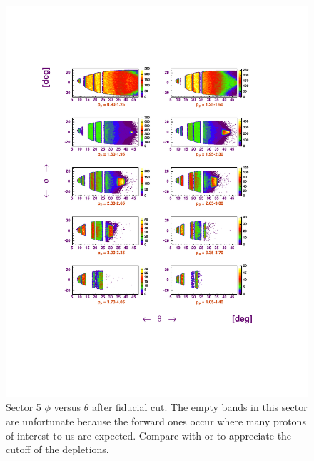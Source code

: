 \cia
\begin{figure}[h]
 \begin{center}
 \includegraphics[width = 14cm, bb=60 140 500 660]{data_reduction/img/fid_p_sector5_result}   
  \caption[Sector 5 $\phi$ versus $\theta$ after fiducial cut]
          { Sector 5 $\phi$ versus $\theta$ after fiducial cut. The empty bands
	             in this sector are unfortunate because the forward ones occur 
		     where many protons of interest to us are expected.
		     Compare with  or 
		     to appreciate the cutoff of the depletions.   }
 \label{fig:fid_p_sector5_result}
 \end{center}
\end{figure}














